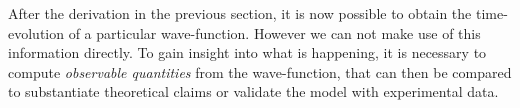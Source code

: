 After the derivation in the previous section, it is now possible to obtain the time-evolution of a particular wave-function.
However we can not make use of this information directly. 
To gain insight into what is happening, it is necessary to compute \emph{observable quantities} from the wave-function, that can then be compared to substantiate theoretical claims or validate the model with experimental data.